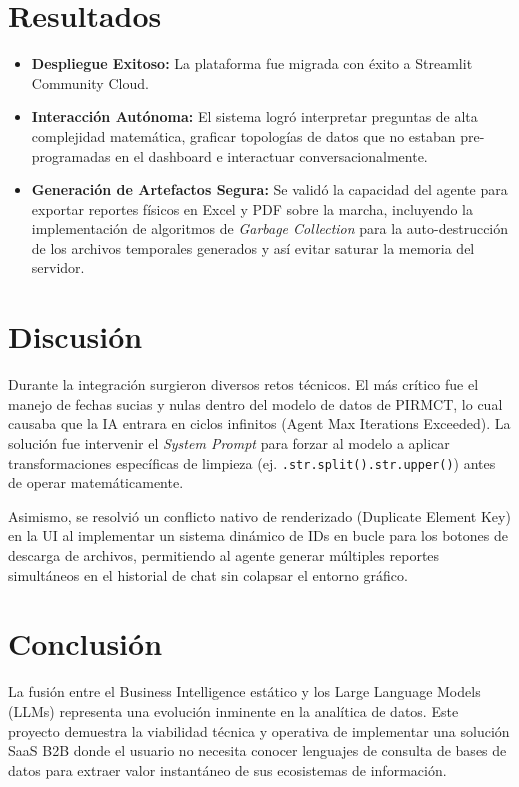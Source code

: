 \documentclass[12pt,a4paper]{article}
\begin{document}
\section{Resultados}
\begin{itemize}
    \item \textbf{Despliegue Exitoso:} La plataforma fue migrada con éxito a Streamlit Community Cloud.
    \item \textbf{Interacción Autónoma:} El sistema logró interpretar preguntas de alta complejidad matemática, graficar topologías de datos que no estaban pre-programadas en el dashboard e interactuar conversacionalmente.
    \item \textbf{Generación de Artefactos Segura:} Se validó la capacidad del agente para exportar reportes físicos en Excel y PDF sobre la marcha, incluyendo la implementación de algoritmos de \textit{Garbage Collection} para la auto-destrucción de los archivos temporales generados y así evitar saturar la memoria del servidor.
\end{itemize}

\section{Discusión}
Durante la integración surgieron diversos retos técnicos. El más crítico fue el manejo de fechas sucias y nulas dentro del modelo de datos de PIRMCT, lo cual causaba que la IA entrara en ciclos infinitos (Agent Max Iterations Exceeded). La solución fue intervenir el \textit{System Prompt} para forzar al modelo a aplicar transformaciones específicas de limpieza (ej. \texttt{.str.split().str.upper()}) antes de operar matemáticamente. 

Asimismo, se resolvió un conflicto nativo de renderizado (Duplicate Element Key) en la UI al implementar un sistema dinámico de IDs en bucle para los botones de descarga de archivos, permitiendo al agente generar múltiples reportes simultáneos en el historial de chat sin colapsar el entorno gráfico.


\newpage


\section{Conclusión}
La fusión entre el Business Intelligence estático y los Large Language Models (LLMs) representa una evolución inminente en la analítica de datos. Este proyecto demuestra la viabilidad técnica y operativa de implementar una solución SaaS B2B donde el usuario no necesita conocer lenguajes de consulta de bases de datos para extraer valor instantáneo de sus ecosistemas de información.
\end{document}
